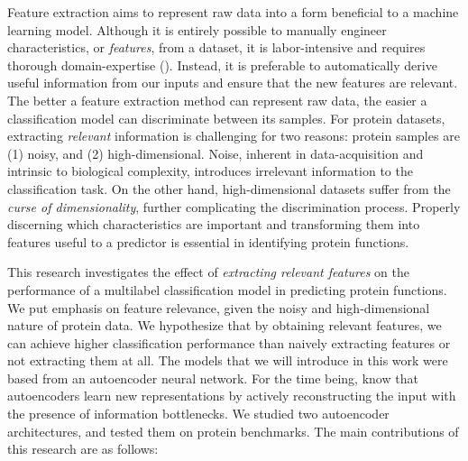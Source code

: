 \par Feature extraction aims to represent raw data into a form beneficial to
a machine learning model. Although it is entirely possible to manually
engineer characteristics, or \textit{features}, from a dataset, it is
labor-intensive and requires thorough domain-expertise
(\cite{bengio2013representation}). Instead, it is preferable to automatically
derive useful information from our inputs and ensure that the new features
are relevant. The better a feature extraction method can represent raw data,
the easier a classification model can discriminate between its samples. For
protein datasets, extracting \textit{relevant} information is challenging for
two reasons: protein samples are (1) noisy, and (2) high-dimensional. Noise,
inherent in data-acquisition and intrinsic to biological complexity,
introduces irrelevant information to the classification task. On the other
hand, high-dimensional datasets suffer from the \textit{curse of
dimensionality}, further complicating the discrimination process. Properly
discerning which characteristics are important and transforming them into
features useful to a predictor is essential in identifying protein functions.

\newpage

\par This research investigates the effect of \textit{extracting relevant
features} on the performance of a multilabel classification model in
predicting protein functions. We put emphasis on feature relevance, given the
noisy and high-dimensional nature of protein data. We hypothesize that by
obtaining relevant features, we can achieve higher classification performance
than naively extracting features or not extracting them at all. The models
that we will introduce in this work were based from an autoencoder neural
network. For the time being, know that autoencoders learn new representations
by actively reconstructing the input with the presence of information
bottlenecks. We studied two autoencoder architectures, and tested them on
protein benchmarks. The main contributions of this research are as follows:

